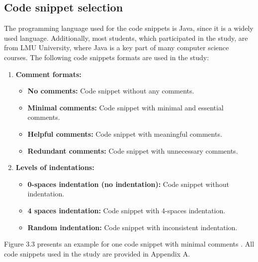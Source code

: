 \subsection{Code snippet selection}

The programming language used for the code snippets is Java, since it is a widely used language.  Additionally, most students, which participated in the study, are from LMU University, where Java is a key part of many computer science courses. The following code snippets formats are used in the study:



\begin{enumerate}
    \item \textbf{Comment formats:}
    \begin{itemize}
        \item \textbf{No comments:} Code snippet without any comments.
        \item \textbf{Minimal comments:} Code snippet with minimal and essential comments.
        \item \textbf{Helpful comments:} Code snippet with meaningful comments.
        \item \textbf{Redundant comments:} Code snippet with unnecessary comments.
    \end{itemize}
    
    \item \textbf{Levels of indentations:}
    \begin{itemize}
        \item \textbf{0-spaces indentation (no indentation):} Code snippet without indentation.
        \item \textbf{4 spaces indentation:} Code snippet with 4-spaces indentation.
        \item \textbf{Random indentation:} Code snippet with inconsistent indentation.
    \end{itemize}
\end{enumerate}

Figure 3.3  presents an example for one code snippet with minimal comments . All code snippets used in the study are provided in Appendix A.


